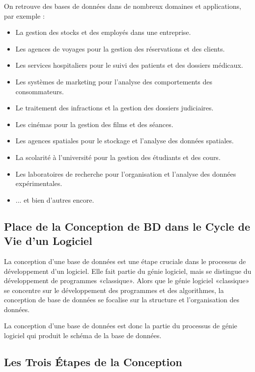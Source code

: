 \documentclass{article}
\begin{document}
On retrouve des bases de données dans de nombreux domaines et applications, par exemple :

\begin{itemize}
    \item La gestion des stocks et des employés dans une entreprise.
    \item Les agences de voyages pour la gestion des réservations et des clients.
    \item Les services hospitaliers pour le suivi des patients et des dossiers médicaux.
    \item Les systèmes de marketing pour l'analyse des comportements des consommateurs.
    \item Le traitement des infractions et la gestion des dossiers judiciaires.
    \item Les cinémas pour la gestion des films et des séances.
    \item Les agences spatiales pour le stockage et l'analyse des données spatiales.
    \item La scolarité à l'université pour la gestion des étudiants et des cours.
    \item Les laboratoires de recherche pour l'organisation et l'analyse des données expérimentales.
    \item ... et bien d'autres encore.
\end{itemize}

\subsection{Place de la Conception de BD dans le Cycle de Vie d'un Logiciel}

La conception d'une base de données est une étape cruciale dans le processus de développement d'un logiciel.  Elle fait partie du génie logiciel, mais se distingue du développement de programmes «classique».  Alors que le génie logiciel «classique» se concentre sur le développement des programmes et des algorithmes, la conception de base de données se focalise sur la structure et l'organisation des données.


La conception d'une base de données est donc la partie du processus de génie logiciel qui produit le schéma de la base de données.

\subsection{Les Trois Étapes de la Conception}
\end{document}
